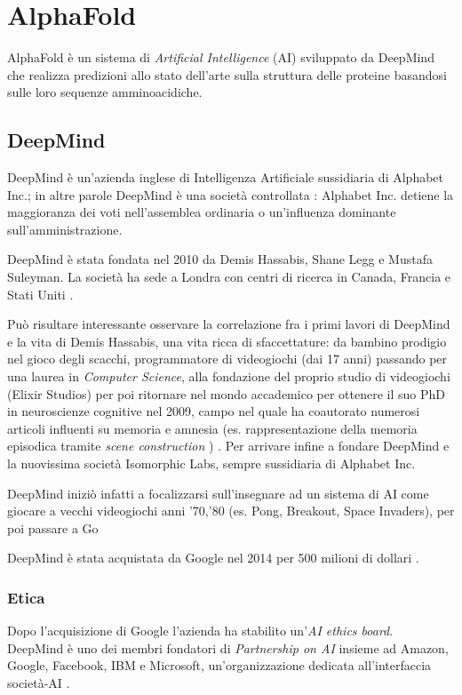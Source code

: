 \chapter{AlphaFold}
AlphaFold è un sistema di \textit{Artificial Intelligence }(AI) sviluppato da DeepMind che realizza predizioni allo stato dell'arte sulla struttura delle proteine basandosi sulle loro sequenze amminoacidiche.

\section{DeepMind}

DeepMind è un'azienda inglese di Intelligenza Artificiale sussidiaria di Alphabet Inc.; in altre parole DeepMind è una società controllata \cite{societaControllataWiki}: Alphabet Inc. detiene la maggioranza dei voti nell'assemblea ordinaria o un'influenza dominante sull'amministrazione.

\par DeepMind è stata fondata nel 2010 da Demis Hassabis, Shane Legg e Mustafa Suleyman. La società ha sede a Londra con centri di ricerca in Canada, Francia e Stati Uniti \cite{deepMindWiki}.

Può risultare interessante osservare la correlazione fra i primi lavori di DeepMind e la vita di Demis Hassabis, una vita ricca di sfaccettature: da bambino prodigio nel gioco degli scacchi, programmatore di videogiochi (dai 17 anni) passando per una laurea in \textit{Computer Science}, alla fondazione del proprio studio di videogiochi (Elixir Studios) per poi ritornare nel mondo accademico per ottenere il suo PhD in neuroscienze cognitive nel 2009, campo nel quale ha coautorato numerosi articoli influenti su memoria e amnesia (es. rappresentazione della memoria episodica tramite \textit{scene construction} \cite{Hassabis2007Jul}) \cite{hassabisWiki}. Per arrivare infine a fondare DeepMind e la nuovissima società Isomorphic Labs, sempre sussidiaria di Alphabet Inc.

\par DeepMind iniziò infatti a focalizzarsi sull'insegnare ad un sistema di AI come giocare a vecchi videogiochi anni '70,'80 (es. Pong, Breakout, Space Invaders), per poi passare a Go

DeepMind è stata acquistata da Google nel 2014 per 500 milioni di dollari \cite{Guardian2014}.

\subsection{Etica}
Dopo l'acquisizione di Google l'azienda ha stabilito un'\textit{AI ethics board}.\\
DeepMind è uno dei membri fondatori di \textit{Partnership on AI} insieme ad Amazon, Google, Facebook, IBM e Microsoft, un'organizzazione dedicata all'interfaccia società-AI \cite{partnershiponai}.

